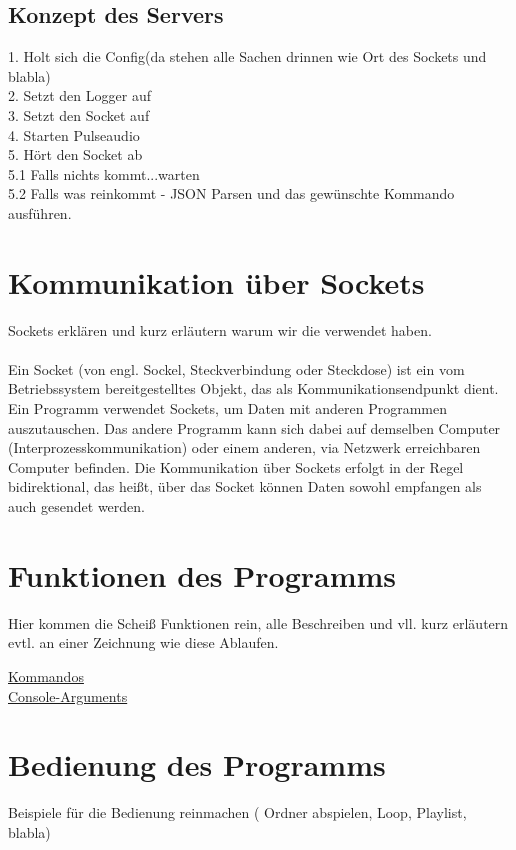 \subsection{Konzept des Servers}

1. Holt sich die Config(da stehen alle Sachen drinnen wie Ort des Sockets und blabla)\\
2. Setzt den Logger auf \\
3. Setzt den Socket auf \\
4. Starten Pulseaudio \\
5. Hört den Socket ab \\
	5.1 Falls nichts kommt...warten \\
	5.2 Falls was reinkommt - JSON Parsen und das gewünschte Kommando ausführen.\\
	

\section{Kommunikation über Sockets}
Sockets erklären und kurz erläutern warum wir die verwendet haben.\\
\\
Ein Socket (von engl. Sockel, Steckverbindung oder Steckdose) ist ein vom Betriebssystem bereitgestelltes Objekt, das als Kommunikationsendpunkt dient. Ein Programm verwendet Sockets, um Daten mit anderen Programmen auszutauschen. Das andere Programm kann sich dabei auf demselben Computer (Interprozesskommunikation) oder einem anderen, via Netzwerk erreichbaren Computer befinden. Die Kommunikation über Sockets erfolgt in der Regel bidirektional, das heißt, über das Socket können Daten sowohl empfangen als auch gesendet werden.

\section{Funktionen des Programms}
Hier kommen die Scheiß Funktionen rein, alle Beschreiben und vll. kurz erläutern evtl. an einer Zeichnung wie diese Ablaufen.

\href{https://github.com/alexanderklapdor/RaspberryPi_Go_Audioplayer#commands-of-the-client}{Kommandos}
\\
\href{https://github.com/alexanderklapdor/RaspberryPi_Go_Audioplayer#console-arguments}{Console-Arguments}


\section{Bedienung des Programms}
Beispiele für die Bedienung reinmachen ( Ordner abspielen, Loop, Playlist, blabla)

